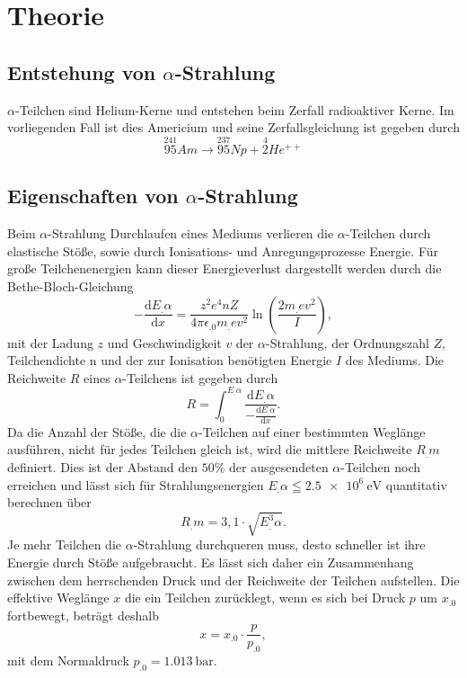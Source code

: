 \section{Theorie}
\label{sec:Theorie}
\subsection{Entstehung von $\alpha$-Strahlung}

$\alpha$-Teilchen sind Helium-Kerne und entstehen beim Zerfall radioaktiver Kerne.\newline
Im vorliegenden Fall ist dies Americium und seine Zerfallsgleichung ist gegeben durch
\[
\overset{241}{95}Am\rightarrow\overset{237}{95}Np + \overset{4}{2} He^{++}
\]

\subsection{Eigenschaften von $\alpha$-Strahlung}
Beim $\alpha$-Strahlung Durchlaufen eines Mediums verlieren die $\alpha$-Teilchen durch elastische Stöße, sowie durch Ionisations- und Anregungsprozesse Energie.
Für große Teilchenenergien kann dieser Energieverlust dargestellt werden durch die Bethe-Bloch-Gleichung
\begin{equation}
-\frac{\mathrm{d}E_.{\alpha}}{\mathrm{d}x}=\frac{z^2e^4nZ}{4\pi\epsilon_.0m_.ev^2}\ln\left(\frac{2m_.ev^2}{I}\right)\label{eq:dE},
\end{equation}
mit der Ladung $z$ und Geschwindigkeit $v$ der $\alpha$-Strahlung, der Ordnungszahl $Z$, Teilchendichte n und der zur Ionisation benötigten Energie $I$ des Mediums.
Die Reichweite $R$ eines $\alpha$-Teilchens ist gegeben durch
\begin{equation}
R=\int_0^{E_.{\alpha}}\frac{\mathrm{d}E_.{\alpha}}{-\frac{\mathrm{d}E_.{\alpha}}{\mathrm{d}x}}\text{.}
\end{equation}
Da die Anzahl der Stöße, die die $\alpha$-Teilchen auf einer bestimmten Weglänge ausführen, nicht für jedes Teilchen gleich ist, wird die mittlere Reichweite $R_.m$ definiert.
Dies ist der Abstand den $50\%$ der ausgesendeten $\alpha$-Teilchen noch erreichen und lässt sich für Strahlungsenergien $E_.{\alpha}\leqq\SI{2,5e6}{\electronvolt}$ quantitativ berechnen über
\begin{equation}
R_.m=3,1\cdot\sqrt{E^3_.{\alpha}}\label{eq:Rm}\text{.}
\end{equation}
Je mehr Teilchen die $\alpha$-Strahlung durchqueren muss, desto schneller ist ihre Energie durch Stöße aufgebraucht. Es lässt sich daher ein Zusammenhang zwischen dem herrschenden Druck und der Reichweite der Teilchen aufstellen. Die effektive Weglänge $x$ die ein Teilchen zurücklegt, wenn es sich bei Druck $p$ um $x_.0$ fortbewegt, beträgt deshalb
\begin{equation}
x=x_.0\cdot\frac{p}{p_.0}\label{eq:x},
\end{equation}
mit dem Normaldruck $p_.0=\SI{1,013}{\bar}$.

